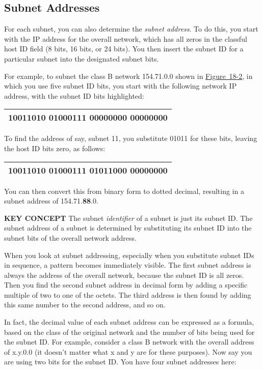 \subsection[Subnet
Addresses]{\texorpdfstring{\protect\hypertarget{ch18s06.htmlux5cux23subnet_addresses}{}{}Subnet
Addresses}{Subnet Addresses}}

For each subnet, you can also determine the {\emph{subnet address}}. To
do this, you start with the IP address for the overall network, which
has all zeros in the classful host ID field (8 bits, 16 bits, or 24
bits). You then insert the subnet ID for a particular subnet into the
designated subnet bits.

For example, to subnet the class B network 154.71.0.0 shown in
\protect\hyperlink{ch18s03.htmlux5cux23determining_the_subnet_mask_of_a_subnett}{Figure~18-2},
in which you use five subnet ID bits, you start with the following
network IP address, with the subnet ID bits highlighted:

\begin{longtable}[]{@{}l@{}}
\toprule
\endhead
10011010 01000111 {\textbf{00000}}000 00000000\tabularnewline
\bottomrule
\end{longtable}

To find the address of say, subnet 11, you substitute 01011 for these
bits, leaving the host ID bits zero, as follows:

\begin{longtable}[]{@{}l@{}}
\toprule
\endhead
10011010 01000111 {\textbf{01011}}000 00000000\tabularnewline
\bottomrule
\end{longtable}

You can then convert this from binary form to dotted decimal, resulting
in a subnet address of 154.71.{\textbf{88}}.0.


{\textbf{KEY CONCEPT}} The subnet {\emph{identifier}} of a subnet is
just its subnet ID. The subnet address of a subnet is determined by
substituting its subnet ID into the subnet bits of the overall network
address.

When you look at subnet addressing, especially when you substitute
subnet IDs in sequence, a pattern becomes immediately visible. The first
subnet address is always the address of the overall network, because the
subnet ID is all zeros. Then you find the second subnet address in
decimal form by adding a specific multiple of two to one of the octets.
The third address is then found by adding this same number to the second
address, and so on.

In fact, the decimal value of each subnet address can be expressed as a
formula, based on the class of the original network and the number of
bits being used for the subnet ID. For example, consider a class B
network with the overall address of x.y.0.0 (it doesn't matter what x
and y are for these purposes). Now say you are using two bits for the
subnet ID. You have four subnet
\protect\hypertarget{ch18s06.htmlux5cux23idx-CHP-18-0740}{}{}addresses
here:

